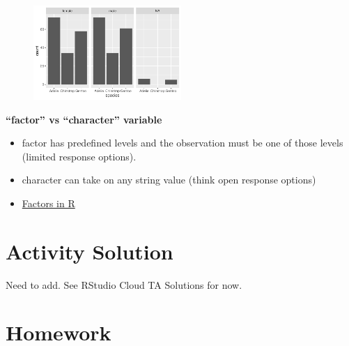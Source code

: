 \documentclass[
  letterpaper,
  DIV=11,
  numbers=noendperiod]{scrreprt}
\providecommand{\tightlist}{%
  \setlength{\itemsep}{0pt}\setlength{\parskip}{0pt}}\usepackage{longtable,booktabs,array}
\begin{document}
\begin{tcolorbox}[enhanced jigsaw, breakable, colback=white, bottomrule=.15mm, leftrule=.75mm, colframe=quarto-callout-note-color-frame, arc=.35mm, rightrule=.15mm, toprule=.15mm, left=2mm, opacityback=0]
\begin{figure}[H]

{\centering \includegraphics[width=0.5\textwidth,height=\textheight]{05-content_files/figure-pdf/faceted-barplot-1.pdf}

}

\end{figure}

\end{tcolorbox}

\begin{tcolorbox}[enhanced jigsaw, breakable, colback=white, bottomrule=.15mm, leftrule=.75mm, colframe=quarto-callout-note-color-frame, arc=.35mm, rightrule=.15mm, toprule=.15mm, left=2mm, opacityback=0]

\textbf{``factor'' vs ``character'' variable}

\begin{itemize}
\tightlist
\item
  factor has predefined levels and the observation must be one of those
  levels (limited response options).
\item
  character can take on any string value (think open response options)
\item
  \href{https://www.stat.berkeley.edu/~s133/factors.html}{Factors in R}
\end{itemize}

\end{tcolorbox}

\hypertarget{activity-solution-3}{%
\section*{Activity Solution}\label{activity-solution-3}}

Need to add. See RStudio Cloud TA Solutions for now.

\hypertarget{homework-4}{%
\section*{Homework}\label{homework-4}}
\end{document}
